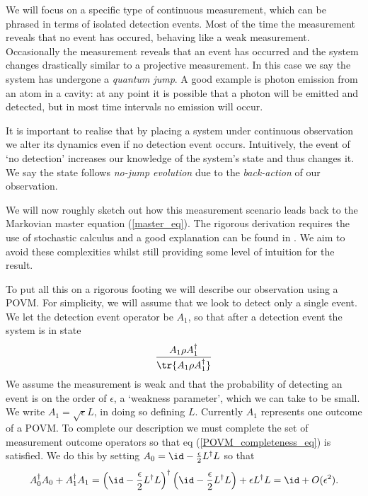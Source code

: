 We will focus on a specific type of continuous measurement, which can be phrased in terms of isolated detection events. Most of the time the measurement reveals that no event has occured, behaving like a weak measurement. Occasionally the measurement reveals that an event has occurred and the system changes drastically similar to a projective measurement. In this case we say the system has undergone a \textit{quantum jump}. A good example is photon emission from an atom in a cavity: at any point it is possible that a photon will be emitted and detected, but in most time intervals no emission will occur.

It is important to realise that by placing a system under continuous observation we alter its dynamics even if no detection event occurs. Intuitively, the event of `no detection' increases our knowledge of the system's state and thus changes it. We say the state follows \textit{no-jump evolution} due to the \textit{back-action} of our observation.

We will now roughly sketch out how this measurement scenario leads back to the Markovian master equation (\ref{master_eq}). The rigorous derivation requires the use of stochastic calculus and a good explanation can be found in \cite{brun}. We aim to avoid these complexities whilst still providing some level of intuition for the result. 

To put all this on a rigorous footing we will describe our observation using a POVM. For simplicity, we will assume that we look to detect only a single  event. We let the detection event operator be $A_1$, so that after a detection event the system is in state
\begin{align}
  \frac{A_1 \rho A_1^\dagger}{\tr\{A_1 \rho A_1^\dagger\}}
\end{align}
We assume the measurement is weak and that the probability of detecting an event is on the order of $\epsilon$, a `weakness parameter', which we can take to be small. We write $A_1 = \sqrt{\epsilon} L$, in doing so defining $L$. Currently $A_1$ represents one outcome of a POVM. To complete our description we must complete the set of measurement outcome operators so that eq (\ref{POVM_completeness_eq}) is satisfied. We do this by setting $A_0 = \id - \frac{\epsilon}{2} L^\dagger L$ so that
\begin{align}
  A_0^\dagger A_0 + A_1^\dagger A_1 = \left( \id - \frac{\epsilon}{2} L^\dagger L\right)^\dagger \left( \id - \frac{\epsilon}{2} L^\dagger L\right) + \epsilon L^\dagger L = \id + O(\epsilon^2).
\end{align}

